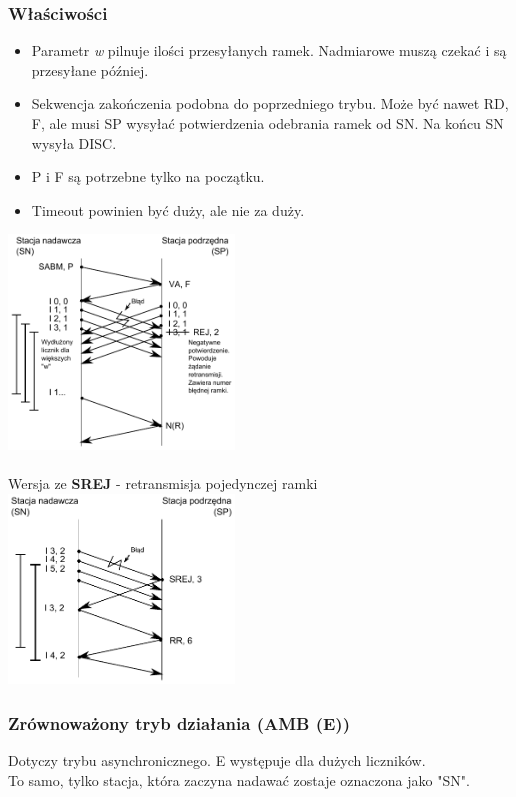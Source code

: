 \documentclass[a4paper,twoside]{article}
\begin{document}
	\subsubsection{Właściwości}
		\begin{itemize}
			\item Parametr \emph{w} pilnuje ilości przesyłanych ramek. Nadmiarowe muszą czekać i są przesyłane później.
			\item Sekwencja zakończenia podobna do poprzedniego trybu. Może być nawet RD, F, ale musi SP wysyłać potwierdzenia odebrania ramek od SN. Na końcu SN wysyła DISC.
			\item P i F są potrzebne tylko na początku.
			\item Timeout powinien być duży, ale nie za duży.
		\end{itemize}
		\includegraphics[width=6cm]{./images/image17.pdf}\\\\
		Wersja ze \textbf{SREJ} - retransmisja pojedynczej ramki\\
		\includegraphics[width=6cm]{./images/image18.pdf}
	\subsubsection{Zrównoważony tryb działania (AMB (E))}
		Dotyczy trybu asynchronicznego. E występuje dla dużych liczników.\\
		To samo, tylko stacja, która zaczyna nadawać zostaje oznaczona jako "SN".
\end{document}
